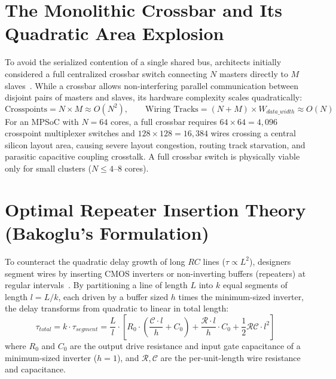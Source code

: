 \section{The Monolithic Crossbar and Its Quadratic Area Explosion}
\label{sec:ch1_crossbar}

To avoid the serialized contention of a single shared bus, architects initially considered a full centralized crossbar switch connecting $N$ masters directly to $M$ slaves~\cite{Passas2012}. While a crossbar allows non-interfering parallel communication between disjoint pairs of masters and slaves, its hardware complexity scales quadratically:
\begin{equation}
\text{Crosspoints} = N \times M \approx O(N^2), \qquad \text{Wiring Tracks} = (N + M) \times W_{data\_width} \approx O(N)
\label{eq:crossbar_complexity}
\end{equation}
For an MPSoC with $N = 64$ cores, a full crossbar requires $64 \times 64 = 4,096$ crosspoint multiplexer switches and $128 \times 128 = 16,384$ wires crossing a central silicon layout area, causing severe layout congestion, routing track starvation, and parasitic capacitive coupling crosstalk. A full crossbar switch is physically viable only for small clusters ($N \le 4$--$8$ cores).

\section{Optimal Repeater Insertion Theory (Bakoglu's Formulation)}
\label{sec:ch1_repeaters}

To counteract the quadratic delay growth of long $RC$ lines ($\tau \propto L^2$), designers segment wires by inserting CMOS inverters or non-inverting buffers (repeaters) at regular intervals~\cite{Bakoglu1990}. By partitioning a line of length $L$ into $k$ equal segments of length $l = L/k$, each driven by a buffer sized $h$ times the minimum-sized inverter, the delay transforms from quadratic to linear in total length:
\begin{equation}
\tau_{total} = k \cdot \tau_{segment} = \frac{L}{l} \cdot \left[ R_0 \cdot \left( \frac{\mathcal{C} \cdot l}{h} + C_0 \right) + \frac{\mathcal{R} \cdot l}{h} \cdot C_0 + \frac{1}{2} \mathcal{R}\mathcal{C} \cdot l^2 \right]
\label{eq:ch1_repeater_delay}
\end{equation}
where $R_0$ and $C_0$ are the output drive resistance and input gate capacitance of a minimum-sized inverter ($h=1$), and $\mathcal{R}, \mathcal{C}$ are the per-unit-length wire resistance and capacitance.

